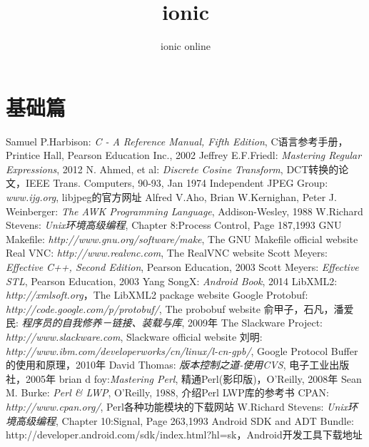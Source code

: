 \documentclass[a4paper]{book}
\author{ionic online}
\title{ionic}
\begin{document}
\maketitle
\tableofcontents

\part{基础篇}

 

\begin{thebibliography}{99}
 Samuel P.Harbison: {\em C - A Reference Manual, Fifth Edition}, C语言参考手册，Printice Hall, Pearson Education Inc., 2002
 Jeffrey E.F.Friedl: {\em Mastering Regular Expressions}, 2012
N. Ahmed, et al: {\em Discrete Cosine Transform}, DCT转换的论文，IEEE Trans. Computers, 90-93, Jan 1974
Independent JPEG Group: {\em www.ijg.org}, libjpeg的官方网址
 Alfred V.Aho, Brian W.Kernighan, Peter J. Weinberger: {\em The AWK Programming Language}, Addison-Wesley, 1988
 W.Richard Stevens: {\em Unix环境高级编程}, Chapter 8:Process Control, Page 187,1993
 GNU Makefile: {\em http://www.gnu.org/software/make}, The GNU Makefile official website
 Real VNC: {\em http://www.realvnc.com}, The RealVNC website
 Scott Meyers: {\em Effective C++, Second Edition}, Pearson Education, 2003
 Scott Meyers: {\em Effective STL}, Pearson Education, 2003
 Yang SongX: {\em Android Book}, 2014
 LibXML2: {\em http://xmlsoft.org}，The LibXML2 package website
 Google Protobuf: {\em http://code.google.com/p/protobuf/}, The probobuf website
 俞甲子，石凡，潘爱民: {\em 程序员的自我修养－链接、装载与库}, 2009年
 The Slackware Project: {\em http://www.slackware.com}, Slackware official website
 刘明: {\em http://www.ibm.com/developerworks/cn/linux/l-cn-gpb/}, Google Protocol Buffer 的使用和原理，2010年
 David Thomas: {\em 版本控制之道-使用CVS}, 电子工业出版社，2005年
 brian d foy:{\em Mastering Perl}, 精通Perl(影印版)，O'Reilly, 2008年
 Sean M. Burke: {\em Perl \& LWP}, O'Reilly, 1988, 介绍Perl LWP库的参考书
 CPAN: {\em http://www.cpan.org/}, Perl各种功能模块的下载网站
 W.Richard Stevens: {\em Unix环境高级编程}, Chapter 10:Signal, Page 263,1993
 Android SDK and ADT Bundle: http://developer.android.com/sdk/index.html?hl=sk，Android开发工具下载地址


\end{thebibliography}
\end{document}
